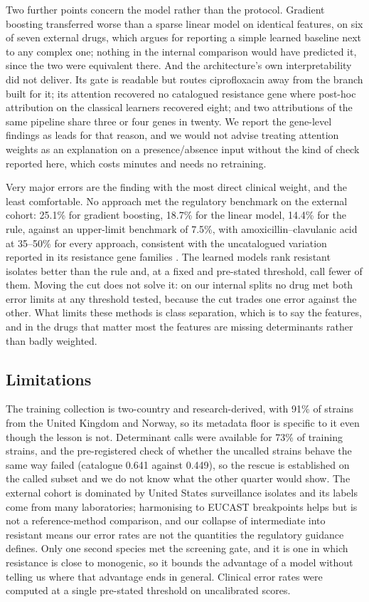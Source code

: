 Two further points concern the model rather than the protocol. Gradient boosting transferred worse
than a sparse linear model on identical features, on six of seven external drugs, which argues for
reporting a simple learned baseline next to any complex one; nothing in the internal comparison
would have predicted it, since the two were equivalent there. And the architecture's own
interpretability did not deliver. Its gate is readable but routes ciprofloxacin away from the branch
built for it; its attention recovered no catalogued resistance gene where post-hoc attribution on
the classical learners recovered eight; and two attributions of the same pipeline share three or
four genes in twenty. We report the gene-level findings as leads for that reason, and we would not
advise treating attention weights as an explanation on a presence/absence input without the kind of
check reported here, which costs minutes and needs no retraining.

Very major errors are the finding with the most direct clinical weight, and the least comfortable.
No approach met the regulatory benchmark on the external cohort: 25.1\% for gradient boosting,
18.7\% for the linear model, 14.4\% for the rule, against an upper-limit benchmark of 7.5\%, with
amoxicillin--clavulanic acid at 35--50\% for every approach, consistent with the uncatalogued
variation reported in its resistance gene families \cite{lipworth2024uncatalogued}. The learned
models rank resistant isolates better than the rule and, at a fixed and pre-stated threshold, call
fewer of them. Moving the cut does not solve it: on our internal splits no drug met both error
limits at any threshold tested, because the cut trades one error against the other. What limits
these methods is class separation, which is to say the features, and in the drugs that matter most
the features are missing determinants rather than badly weighted.

\subsection*{Limitations}
The training collection is two-country and research-derived, with 91\% of strains from the United
Kingdom and Norway, so its metadata floor is specific to it even though the lesson is not.
Determinant calls were available for 73\% of training strains, and the pre-registered check of
whether the uncalled strains behave the same way failed (catalogue \nap{} 0.641 against 0.449), so
the rescue is established on the called subset and we do not know what the other quarter would
show. The external cohort is dominated by United States surveillance isolates and its labels come
from many laboratories; harmonising to EUCAST breakpoints helps but is not a reference-method
comparison, and our collapse of intermediate into resistant means our error rates are not the
quantities the regulatory guidance defines. Only one second species met the screening gate, and it
is one in which resistance is close to monogenic, so it bounds the advantage of a model without
telling us where that advantage ends in general. Clinical error rates were computed at a single
pre-stated threshold on uncalibrated scores.

